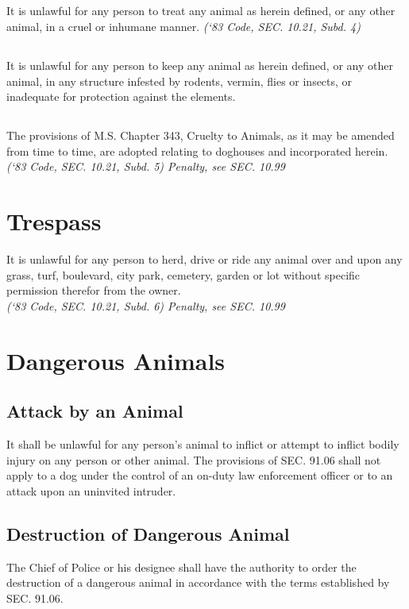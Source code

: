 \subsection{}
It is unlawful for any person to treat any animal as herein defined, or any other animal, in a cruel or inhumane manner.\newline
\emph{(‘83 Code, SEC. 10.21, Subd. 4)}
\subsection{}
It is unlawful for any person to keep any animal as herein defined, or any other animal, in any structure infested by rodents, vermin, flies or insects, or inadequate for protection against the elements.
\subsection{}
The provisions of M.S. Chapter 343, Cruelty to Animals, as it may be amended from time to time, are adopted relating to doghouses and incorporated herein.\\
\emph{(‘83 Code, SEC. 10.21, Subd. 5)  Penalty, see SEC. 10.99}

\section{Trespass}
It is unlawful for any person to herd, drive or ride any animal over and upon any grass, turf, boulevard, city park, cemetery, garden or lot without specific permission therefor from the owner.\\
\emph{(‘83 Code, SEC. 10.21, Subd. 6)  Penalty, see SEC. 10.99}

\section{Dangerous Animals}
\subsection{Attack by an Animal}
It shall be unlawful for any person’s animal to inflict or attempt to inflict bodily injury on any person or other animal. The provisions of SEC. 91.06 shall not apply to a dog under the control of an on-duty law enforcement officer or to an attack upon an uninvited intruder.
\subsection{Destruction of Dangerous Animal}
The Chief of Police or his designee shall have the authority to order the destruction of a dangerous animal in accordance with the terms established by SEC. 91.06.
